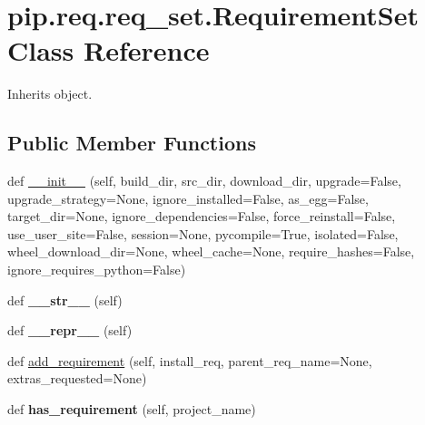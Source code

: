 \hypertarget{classpip_1_1req_1_1req__set_1_1_requirement_set}{}\section{pip.\+req.\+req\+\_\+set.\+Requirement\+Set Class Reference}
\label{classpip_1_1req_1_1req__set_1_1_requirement_set}


Inherits object.

\subsection*{Public Member Functions}
\begin{DoxyCompactItemize}
\item 
def \hyperlink{classpip_1_1req_1_1req__set_1_1_requirement_set_ab42a9bcf128aac794619cdd34097f5af}{\+\_\+\+\_\+init\+\_\+\+\_\+} (self, build\+\_\+dir, src\+\_\+dir, download\+\_\+dir, upgrade=False, upgrade\+\_\+strategy=None, ignore\+\_\+installed=False, as\+\_\+egg=False, target\+\_\+dir=None, ignore\+\_\+dependencies=False, force\+\_\+reinstall=False, use\+\_\+user\+\_\+site=False, session=None, pycompile=True, isolated=False, wheel\+\_\+download\+\_\+dir=None, wheel\+\_\+cache=None, require\+\_\+hashes=False, ignore\+\_\+requires\+\_\+python=False)
\item 
\mbox{\label{classpip_1_1req_1_1req__set_1_1_requirement_set_afbc51b4fda53c1126a47ccb59c0b1a56}} 
def {\bfseries \+\_\+\+\_\+str\+\_\+\+\_\+} (self)
\item 
\mbox{\label{classpip_1_1req_1_1req__set_1_1_requirement_set_af2fd4224b027aa3ee256fe4c55fe70b7}} 
def {\bfseries \+\_\+\+\_\+repr\+\_\+\+\_\+} (self)
\item 
def \hyperlink{classpip_1_1req_1_1req__set_1_1_requirement_set_a8cacf654f61cd826c8b90b9ff94e7de8}{add\+\_\+requirement} (self, install\+\_\+req, parent\+\_\+req\+\_\+name=None, extras\+\_\+requested=None)
\item 
\mbox{\label{classpip_1_1req_1_1req__set_1_1_requirement_set_aeced9c39a36c7781556da676337e8c48}} 
def {\bfseries has\+\_\+requirement} (self, project\+\_\+name)
\item 

\end{DoxyCompactItemize}
